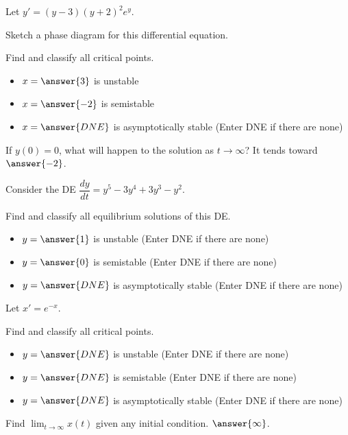 \documentclass{ximera}
\begin{document}
\begin{exercise}
    Let $y' = (y-3)(y+2)^2e^y$. 
    \begin{hint}
        Sketch a phase diagram for this differential equation. 
    \end{hint}
    
    Find and classify all critical points. 
    \begin{itemize}
        \item $x = \answer{3}$ is unstable
        \item $x = \answer{-2}$ is semistable
        \item $x = \answer{DNE}$  is asymptotically stable (Enter DNE if there are none)
    \end{itemize}
    \begin{problem}
        If $y(0) = 0$, what will happen to the solution as $t \rightarrow \infty$? It tends toward $\answer{-2}$.
    \end{problem}
\end{exercise}

\begin{exercise}
    Consider the DE $\dfrac{dy}{dt}=y^5-3y^4+3y^3-y^2$. %
    
    Find and classify all equilibrium solutions of this DE. %
    \begin{itemize}
        \item $y = \answer{1}$ is unstable (Enter DNE if there are none)
        \item $y = \answer{0}$ is semistable (Enter DNE if there are none)
        \item $y = \answer{DNE}$ is asymptotically stable (Enter DNE if there are none)
    \end{itemize}
\end{exercise}

\begin{exercise}
    Let $x'=e^{-x}$.
    
    Find and classify all critical points.
    \begin{itemize}
        \item $y = \answer{DNE}$ is unstable (Enter DNE if there are none)
        \item $y = \answer{DNE}$ is semistable (Enter DNE if there are none)
        \item $y = \answer{DNE}$ is asymptotically stable (Enter DNE if there are none)
    \end{itemize}
    Find $\displaystyle \lim_{t\to\infty} x(t)$ given any initial condition. $\answer{\infty}$.
\end{exercise}
\end{document}
